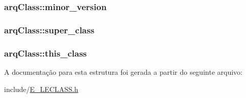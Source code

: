 \subsubsection[{minor\+\_\+version}]{ arq\+Class\+::minor\+\_\+version}\label{structarq_class_a90b447e4eea035e1dd5fb45360a6a09f}
\hypertarget{structarq_class_a7bd81d496166908031c40895ed667ada}{}
\subsubsection[{super\+\_\+class}]{ arq\+Class\+::super\+\_\+class}\label{structarq_class_a7bd81d496166908031c40895ed667ada}
\hypertarget{structarq_class_a0fa1b4b35fcc35e25fff7563f1ce7b2b}{}
\subsubsection[{this\+\_\+class}]{ arq\+Class\+::this\+\_\+class}\label{structarq_class_a0fa1b4b35fcc35e25fff7563f1ce7b2b}


A documentação para esta estrutura foi gerada a partir do seguinte arquivo\+:\begin{DoxyCompactItemize}
\item 
include/\hyperlink{_e___l_e_c_l_a_s_s_8h}{E\+\_\+\+L\+E\+C\+L\+A\+S\+S.\+h}\end{DoxyCompactItemize}
